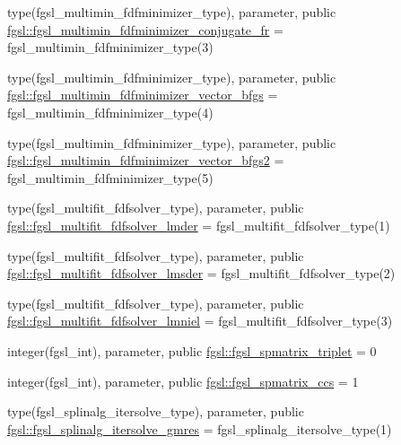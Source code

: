 \begin{DoxyCompactItemize}
\item 
type(fgsl\+\_\+multimin\+\_\+fdfminimizer\+\_\+type), parameter, public \hyperlink{namespacefgsl_a94fc756d777c9358f808374b01e6a879}{fgsl\+::fgsl\+\_\+multimin\+\_\+fdfminimizer\+\_\+conjugate\+\_\+fr} = fgsl\+\_\+multimin\+\_\+fdfminimizer\+\_\+type(3)
\item 
type(fgsl\+\_\+multimin\+\_\+fdfminimizer\+\_\+type), parameter, public \hyperlink{namespacefgsl_a98f35d82aab613681b886c2582cb98d2}{fgsl\+::fgsl\+\_\+multimin\+\_\+fdfminimizer\+\_\+vector\+\_\+bfgs} = fgsl\+\_\+multimin\+\_\+fdfminimizer\+\_\+type(4)
\item 
type(fgsl\+\_\+multimin\+\_\+fdfminimizer\+\_\+type), parameter, public \hyperlink{namespacefgsl_a6cc130b66b81b66a085cfb1882c711e6}{fgsl\+::fgsl\+\_\+multimin\+\_\+fdfminimizer\+\_\+vector\+\_\+bfgs2} = fgsl\+\_\+multimin\+\_\+fdfminimizer\+\_\+type(5)
\item 
type(fgsl\+\_\+multifit\+\_\+fdfsolver\+\_\+type), parameter, public \hyperlink{namespacefgsl_a8d1aeaeb6d1cc87ec0d79eddf44965b8}{fgsl\+::fgsl\+\_\+multifit\+\_\+fdfsolver\+\_\+lmder} = fgsl\+\_\+multifit\+\_\+fdfsolver\+\_\+type(1)
\item 
type(fgsl\+\_\+multifit\+\_\+fdfsolver\+\_\+type), parameter, public \hyperlink{namespacefgsl_a24b9409272a5a9556e295c38502b6dbc}{fgsl\+::fgsl\+\_\+multifit\+\_\+fdfsolver\+\_\+lmsder} = fgsl\+\_\+multifit\+\_\+fdfsolver\+\_\+type(2)
\item 
type(fgsl\+\_\+multifit\+\_\+fdfsolver\+\_\+type), parameter, public \hyperlink{namespacefgsl_a144e01074d63149cca26a52ae3ee1ad0}{fgsl\+::fgsl\+\_\+multifit\+\_\+fdfsolver\+\_\+lmniel} = fgsl\+\_\+multifit\+\_\+fdfsolver\+\_\+type(3)
\item 
integer(fgsl\+\_\+int), parameter, public \hyperlink{namespacefgsl_ad1d59263ef6dcca33e1e5408bd60e2dd}{fgsl\+::fgsl\+\_\+spmatrix\+\_\+triplet} = 0
\item 
integer(fgsl\+\_\+int), parameter, public \hyperlink{namespacefgsl_a9df148463077417441f15cbe0a523a2e}{fgsl\+::fgsl\+\_\+spmatrix\+\_\+ccs} = 1
\item 
type(fgsl\+\_\+splinalg\+\_\+itersolve\+\_\+type), parameter, public \hyperlink{namespacefgsl_aaba217bc420e45e1706c82a957de5e7c}{fgsl\+::fgsl\+\_\+splinalg\+\_\+itersolve\+\_\+gmres} = fgsl\+\_\+splinalg\+\_\+itersolve\+\_\+type(1)
\end{DoxyCompactItemize}
